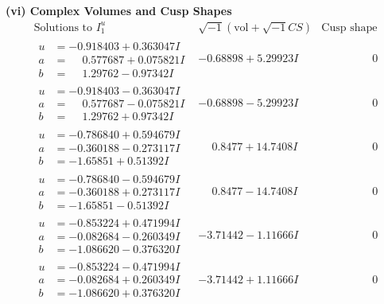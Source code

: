 \documentclass[1p]{elsarticle_modified}
\theoremstyle{definition}
\newcommand{\I}{\sqrt{-1}}
\begin{document}
\newpage\flushleft \textbf{(vi) Complex Volumes and Cusp Shapes}
$$\begin{array}{c|c|c}  
\text{Solutions to }I^u_{1}& \I (\text{vol} + \sqrt{-1}CS) & \text{Cusp shape}\\
 \hline 
\begin{aligned}
u &= -0.918403 + 0.363047 I \\
a &= \phantom{-}0.577687 + 0.075821 I \\
b &= \phantom{-}1.29762 - 0.97342 I\end{aligned}
 & -0.68898 + 5.29923 I & \phantom{-0.000000 } 0 \\ \hline\begin{aligned}
u &= -0.918403 - 0.363047 I \\
a &= \phantom{-}0.577687 - 0.075821 I \\
b &= \phantom{-}1.29762 + 0.97342 I\end{aligned}
 & -0.68898 - 5.29923 I & \phantom{-0.000000 } 0 \\ \hline\begin{aligned}
u &= -0.786840 + 0.594679 I \\
a &= -0.360188 - 0.273117 I \\
b &= -1.65851 + 0.51392 I\end{aligned}
 & \phantom{-}0.8477 + 14.7408 I & \phantom{-0.000000 } 0 \\ \hline\begin{aligned}
u &= -0.786840 - 0.594679 I \\
a &= -0.360188 + 0.273117 I \\
b &= -1.65851 - 0.51392 I\end{aligned}
 & \phantom{-}0.8477 - 14.7408 I & \phantom{-0.000000 } 0 \\ \hline\begin{aligned}
u &= -0.853224 + 0.471994 I \\
a &= -0.082684 - 0.260349 I \\
b &= -1.086620 - 0.376320 I\end{aligned}
 & -3.71442 - 1.11666 I & \phantom{-0.000000 } 0 \\ \hline\begin{aligned}
u &= -0.853224 - 0.471994 I \\
a &= -0.082684 + 0.260349 I \\
b &= -1.086620 + 0.376320 I\end{aligned}
 & -3.71442 + 1.11666 I & \phantom{-0.000000 } 0 \\ \hline\begin{aligned}

\end{aligned}
\end{array}$$
\end{document}
